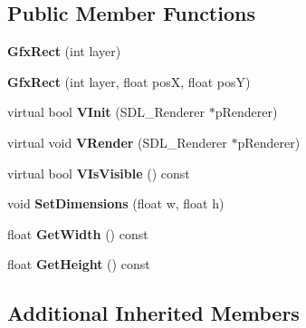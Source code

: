 \subsection*{Public Member Functions}
\begin{DoxyCompactItemize}
\item 
\hypertarget{classGfxRect_ab20f210640d2b61e1b1cead9b64a8553}{{\bfseries Gfx\-Rect} (int layer)}\label{classGfxRect_ab20f210640d2b61e1b1cead9b64a8553}

\item 
\hypertarget{classGfxRect_a10943274e42970f14128d1241e0245d1}{{\bfseries Gfx\-Rect} (int layer, float pos\-X, float pos\-Y)}\label{classGfxRect_a10943274e42970f14128d1241e0245d1}

\item 
\hypertarget{classGfxRect_afa325fe5df0fbc7dd0d5d5600fd638ac}{virtual bool {\bfseries V\-Init} (S\-D\-L\-\_\-\-Renderer $\ast$p\-Renderer)}\label{classGfxRect_afa325fe5df0fbc7dd0d5d5600fd638ac}

\item 
\hypertarget{classGfxRect_a846b429dce3aeaa8c926893da92d9104}{virtual void {\bfseries V\-Render} (S\-D\-L\-\_\-\-Renderer $\ast$p\-Renderer)}\label{classGfxRect_a846b429dce3aeaa8c926893da92d9104}

\item 
\hypertarget{classGfxRect_a4fda9b8c2870caea04dc2e6234bf71eb}{virtual bool {\bfseries V\-Is\-Visible} () const }\label{classGfxRect_a4fda9b8c2870caea04dc2e6234bf71eb}

\item 
\hypertarget{classGfxRect_afbf7918119046f219838a488140888b8}{void {\bfseries Set\-Dimensions} (float w, float h)}\label{classGfxRect_afbf7918119046f219838a488140888b8}

\item 
\hypertarget{classGfxRect_af553d4fcbdea8a8d7d91e407a92cc858}{float {\bfseries Get\-Width} () const }\label{classGfxRect_af553d4fcbdea8a8d7d91e407a92cc858}

\item 
\hypertarget{classGfxRect_a858c78d0fb2084ede6ff4c6fe9c8d090}{float {\bfseries Get\-Height} () const }\label{classGfxRect_a858c78d0fb2084ede6ff4c6fe9c8d090}

\end{DoxyCompactItemize}
\subsection*{Additional Inherited Members}


